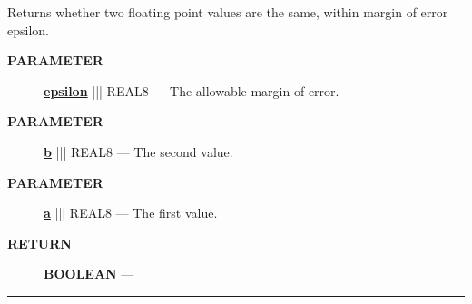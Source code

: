 \par





Returns whether two floating point values are the same, within margin of error epsilon.






\par
\begin{description}
\item [\colorbox{tagtype}{\color{white} \textbf{\textsf{PARAMETER}}}] \textbf{\underline{epsilon}} ||| REAL8 --- The allowable margin of error.
\item [\colorbox{tagtype}{\color{white} \textbf{\textsf{PARAMETER}}}] \textbf{\underline{b}} ||| REAL8 --- The second value.
\item [\colorbox{tagtype}{\color{white} \textbf{\textsf{PARAMETER}}}] \textbf{\underline{a}} ||| REAL8 --- The first value.
\end{description}







\par
\begin{description}
\item [\colorbox{tagtype}{\color{white} \textbf{\textsf{RETURN}}}] \textbf{BOOLEAN} --- 
\end{description}




\rule{\linewidth}{0.5pt}


